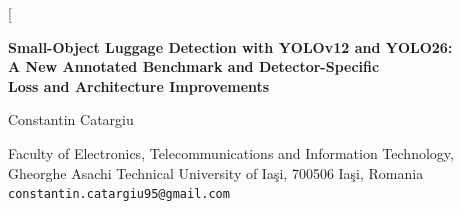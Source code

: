 \documentclass[10pt,twocolumn,a4paper]{article}
\begin{document}
\twocolumn[
\begin{@twocolumnfalse}
\begin{center}
{\LARGE\bfseries Small-Object Luggage Detection with YOLOv12 and YOLO26:\\[2pt]
A New Annotated Benchmark and Detector-Specific\\[2pt]
Loss and Architecture Improvements\par}
\vspace{10pt}
{\large Constantin Catargiu\par}
\vspace{4pt}
{\small Faculty of Electronics, Telecommunications and Information Technology,\\
Gheorghe Asachi Technical University of Ia\c{s}i, 700506 Ia\c{s}i, Romania\\
\texttt{constantin.catargiu95@gmail.com}\par}
\vspace{14pt}
\end{center}


\end{@twocolumnfalse}
\end{document}
